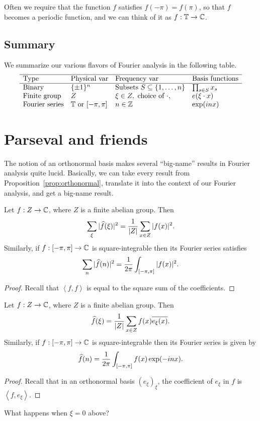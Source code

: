 Often we require that the function $f$ satisfies $f(-\pi) = f(\pi)$,
so that $f$ becomes a periodic function,
and we can think of it as $f : \mathbb T \to \mathbb C$.

\subsection{Summary}
We summarize our various flavors of Fourier analysis in the following table.
\[
	\begin{array}{llll}
		\hline
		\text{Type} & \text{Physical var} & \text{Frequency var}
			& \text{Basis functions} \\ \hline
		\text{Binary} & \{\pm1\}^n
			& \text{Subsets } S \subseteq \left\{ 1, \dots, n \right\}
			& \prod_{s \in S} x_s \\
		\text{Finite group} & Z & \xi \in Z, \text{ choice of } \cdot,
			& e(\xi \cdot x) \\
		\text{Fourier series} & \mathbb T \text{ or } [-\pi, \pi] & n \in \mathbb Z
			& \exp(inx) \\
	\end{array}
\]

\section{Parseval and friends}
The notion of an orthonormal basis makes several ``big-name'' results
in Fourier analysis quite lucid.
Basically, we can take every result from Proposition~\ref{prop:orthonormal},
translate it into the context of our Fourier analysis,
and get a big-name result.

\begin{corollary}
	Let $f : Z \to \mathbb C$, where $Z$ is a finite abelian group.
	Then \[ \sum_\xi |\widehat f(\xi)|^2 = \frac{1}{|Z|} \sum_{x \in Z} |f(x)|^2. \]
	Similarly, if $f : [-\pi, \pi] \to \mathbb C$ is square-integrable then
	its Fourier series satisfies
	\[ \sum_n |\widehat f(n)|^2 = \frac{1}{2\pi} \int_{[-\pi, \pi]} |f(x)|^2. \]
\end{corollary}
\begin{proof}
Recall that $\left< f,f\right>$ is equal to the
square sum of the coefficients.
\end{proof}

\begin{corollary}
	Let $f : Z \to \mathbb C$, where $Z$ is a finite abelian group.
	Then \[ \widehat f(\xi) = \frac{1}{|Z|} \sum_{x \in Z} f(x) \overline{e_\xi(x)}. \]
	Similarly, if $f : [-\pi, \pi] \to \mathbb C$ is square-integrable then
	its Fourier series is given by
	\[ \widehat f(n) = \frac{1}{2\pi} \int_{[-\pi, \pi]} f(x) \exp(-inx). \]
\end{corollary}
\begin{proof}
Recall that in an orthonormal basis $(e_\xi)_\xi$,
the coefficient of $e_\xi$ in $f$ is $\left< f, e_\xi\right>$.
\end{proof}
\begin{ques}
	What happens when $\xi = 0$ above?
\end{ques}

